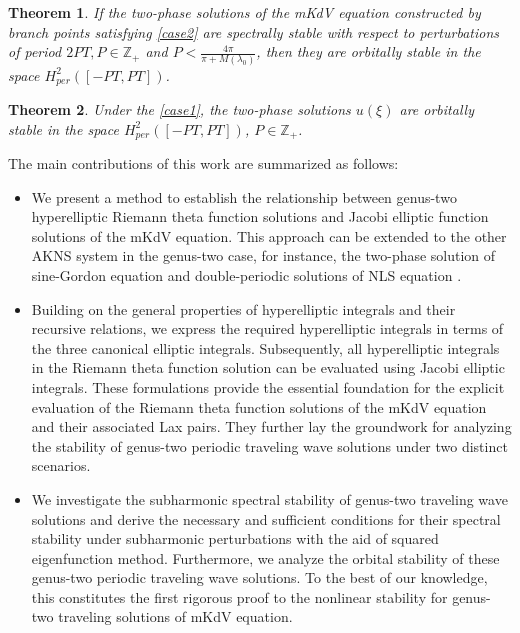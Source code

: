 \documentclass[11pt,reqno]{amsart}
\newtheorem{theorem}{Theorem}
\numberwithin{equation}{section}
\begin{document}
\begin{theorem}\label{theorem:orbital-cn}
	If the two-phase solutions of the mKdV equation constructed by branch points satisfying \ref{case2} are spectrally stable with respect to perturbations of period $2PT,P\in \mathbb{Z}_{+}$ and $P< \frac{4\pi}{\pi+ M(\lambda_0)}$, then they are orbitally stable in the space $H^2_{per}([-PT,PT])$.
\end{theorem}

\begin{theorem}\label{theorem:orbital-dn}
	 Under the \ref{case1}, the two-phase solutions $u(\xi)$ are orbitally stable in the space $H^2_{per}([-PT,PT])$, $P\in \mathbb{Z}_{+}$.
\end{theorem}


The main contributions of this work are summarized as follows:
\begin{itemize}
	\item We present a method to establish the relationship between genus-two hyperelliptic Riemann theta function solutions and Jacobi elliptic function solutions of the mKdV equation. This approach can be extended to the other AKNS system in the genus-two case, for instance, the two-phase solution of  sine-Gordon equation \cite{DubrovinN-1982} and double-periodic solutions of NLS equation \cite{ChenPW-19}. 
	\item Building on the general properties of hyperelliptic integrals and their recursive relations, we express the required hyperelliptic integrals in terms of the three canonical elliptic integrals. Subsequently, all hyperelliptic integrals in the Riemann theta function solution can be evaluated using Jacobi elliptic integrals.
	These formulations provide the essential foundation for the explicit evaluation of the Riemann theta function solutions of the mKdV equation and their associated Lax pairs. 
	They further lay the groundwork for analyzing the stability of genus-two periodic traveling wave solutions under two distinct scenarios.	
	\item We investigate the subharmonic spectral stability of genus-two traveling wave solutions and derive the necessary and sufficient conditions for their spectral stability under subharmonic perturbations with the aid of squared eigenfunction method. 
	Furthermore, we analyze the orbital stability of these genus-two periodic traveling wave solutions. To the best of our knowledge, this constitutes the first rigorous proof to the nonlinear stability for genus-two traveling solutions of mKdV equation.
\end{itemize}
\end{document}
